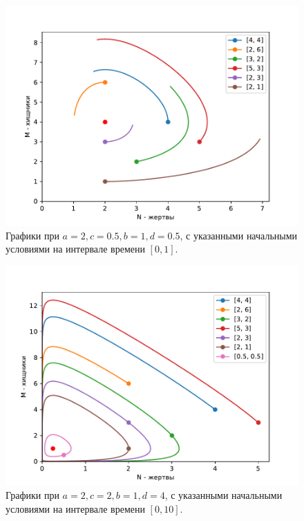         \begin{figure}[H]
            \centering
            \includegraphics[width=12cm]{pictures/population4.pdf}
            \caption{Графики при $a = 2, c = 0.5, b = 1, d = 0.5$, с указанными начальными условиями на интервале времени $ [0, 1] $.}
        \end{figure}

        \begin{figure}[H]
            \centering
            \includegraphics[width=12cm]{pictures/population5.pdf}
            \caption{Графики при $a = 2, c = 2, b = 1, d = 4$, с указанными начальными условиями на интервале времени $ [0, 10] $.}
        \end{figure}


